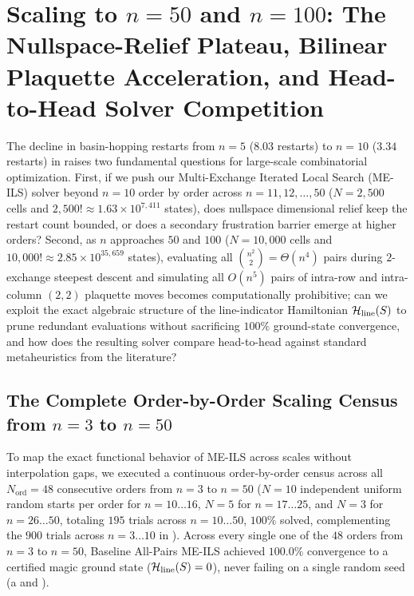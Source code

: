 \section{Scaling to \texorpdfstring{$n = 50$}{n = 50} and \texorpdfstring{$n = 100$}{n = 100}: The Nullspace-Relief Plateau, Bilinear Plaquette Acceleration, and Head-to-Head Solver Competition}
\label{sec:large_scale}

The decline in basin-hopping restarts from $n = 5$ ($8.03$ restarts) to $n = 10$ ($3.34$ restarts) in  raises two fundamental questions for large-scale combinatorial optimization. First, if we push our Multi-Exchange Iterated Local Search (ME-ILS) solver beyond $n = 10$ order by order across $n = 11, 12, \dots, 50$ ($N = 2{,}500$ cells and $2{,}500! \approx 1.63\times 10^{7{,}411}$ states), does nullspace dimensional relief keep the restart count bounded, or does a secondary frustration barrier emerge at higher orders? Second, as $n$ approaches $50$ and $100$ ($N = 10{,}000$ cells and $10{,}000! \approx 2.85\times 10^{35{,}659}$ states), evaluating all $\binom{n^2}{2} = \Theta(n^4)$ pairs during $2$-exchange steepest descent and simulating all $O(n^5)$ pairs of intra-row and intra-column $(2,2)$ plaquette moves becomes computationally prohibitive; can we exploit the exact algebraic structure of the line-indicator Hamiltonian $\mathcal{H}_{\mathrm{line}}(S)$ to prune redundant evaluations without sacrificing $100\%$ ground-state convergence, and how does the resulting solver compare head-to-head against standard metaheuristics from the literature?

\subsection{The Complete Order-by-Order Scaling Census from \texorpdfstring{$n = 3$}{n = 3} to \texorpdfstring{$n = 50$}{n = 50}}

To map the exact functional behavior of ME-ILS across scales without interpolation gaps, we executed a continuous order-by-order census across all $N_{\mathrm{ord}} = 48$ consecutive orders from $n = 3$ to $n = 50$ ($N=10$ independent uniform random starts per order for $n = 10\dots 16$, $N=5$ for $n = 17\dots 25$, and $N=3$ for $n = 26\dots 50$, totaling $195$ trials across $n=10\dots 50$, $100\%$ solved, complementing the $900$ trials across $n = 3\dots 10$ in ). Across every single one of the $48$ orders from $n = 3$ to $n = 50$, Baseline All-Pairs ME-ILS achieved $100.0\%$ convergence to a certified magic ground state ($\mathcal{H}_{\mathrm{line}}(S) = 0$), never failing on a single random seed (a and ).

